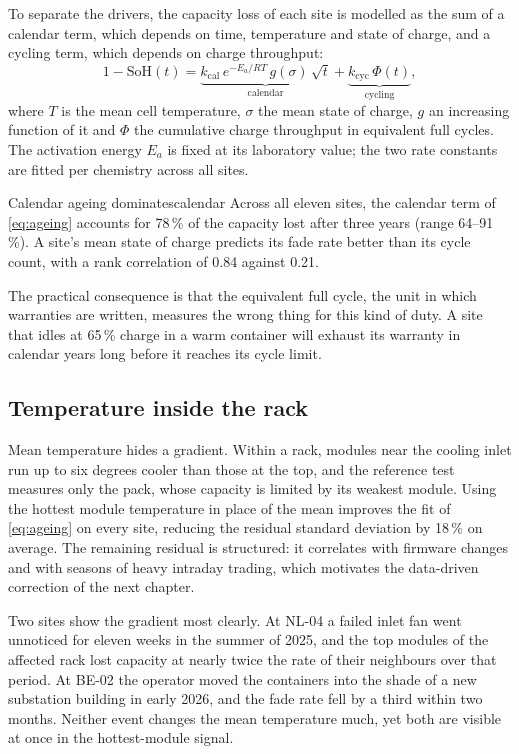 To separate the drivers, the capacity loss of each site is modelled as
the sum of a calendar term, which depends on time, temperature and state
of charge, and a cycling term, which depends on charge throughput:
\begin{equation}
  1 - \mathrm{SoH}(t) =
    \underbrace{k_\mathrm{cal}\,
      e^{-E_a / R T}\, g(\sigma)\, \sqrt{t}}_{\text{calendar}}
    + \underbrace{k_\mathrm{cyc}\, \Phi(t)}_{\text{cycling}},
  \label{eq:ageing}
\end{equation}
where \(T\) is the mean cell temperature, \(\sigma\) the mean state of
charge, \(g\) an increasing function of it and \(\Phi\) the cumulative
charge throughput in equivalent full cycles. The activation energy
\(E_a\) is fixed at its laboratory value; the two rate constants are fitted
per chemistry across all sites.

\begin{keyresult}{Calendar ageing dominates}{calendar}
  Across all eleven sites, the calendar term of \cref{eq:ageing}
  accounts for 78\,\% of the capacity lost after three years (range
  64--91\,\%). A site's mean state of charge predicts its fade rate better
  than its cycle count, with a rank correlation of 0.84 against 0.21.
\end{keyresult}

The practical consequence is that the equivalent full cycle, the unit in
which warranties are written, measures the wrong thing for this kind of
duty. A site that idles at 65\,\% charge in a warm container will exhaust
its warranty in calendar years long before it reaches its cycle limit.

\subsection{Temperature inside the rack}
\label{sec:temperature}

Mean temperature hides a gradient. Within a rack, modules near the
cooling inlet run up to six degrees cooler than those at the top, and the
reference test measures only the pack, whose capacity is limited by its
weakest module. Using the hottest module temperature in place of the
mean improves the fit of \cref{eq:ageing} on every site, reducing the
residual standard deviation by 18\,\% on average. The remaining residual
is structured: it correlates with firmware changes and with seasons of
heavy intraday trading, which motivates the data-driven correction of the
next chapter.

Two sites show the gradient most clearly. At NL-04 a failed inlet fan
went unnoticed for eleven weeks in the summer of 2025, and the top modules
of the affected rack lost capacity at nearly twice the rate of their
neighbours over that period. At BE-02 the operator moved the containers
into the shade of a new substation building in early 2026, and the fade
rate fell by a third within two months. Neither event changes the mean
temperature much, yet both are visible at once in the hottest-module
signal.
